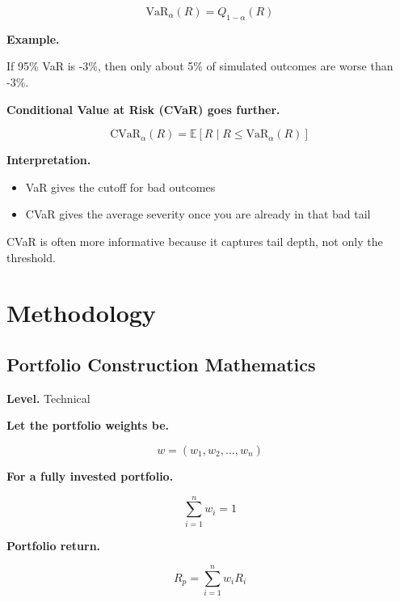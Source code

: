 \documentclass[11pt]{report}
\begin{document}
\begin{equation}
\mathrm{VaR}_{\alpha}(R) = Q_{1-\alpha}(R)
\end{equation}

\begin{callout}
\textbf{Example.}

If 95\% VaR is -3\%, then only about 5\% of simulated outcomes are worse than -3\%.
\end{callout}

\textbf{Conditional Value at Risk (CVaR) goes further.}

\begin{equation}
\mathrm{CVaR}_{\alpha}(R) = \mathbb{E}[R \mid R \le \mathrm{VaR}_{\alpha}(R)]
\end{equation}

\textbf{Interpretation.}

\begin{itemize}
\item VaR gives the cutoff for bad outcomes
\item CVaR gives the average severity once you are already in that bad tail
\end{itemize}

CVaR is often more informative because it captures tail depth, not only the threshold.

\chapter{Methodology}

\section{Portfolio Construction Mathematics}
\begin{callout}
\textbf{Level.} Technical
\end{callout}

\textbf{Let the portfolio weights be.}

\begin{equation}
w = (w_1, w_2, \dots, w_n)
\end{equation}

\textbf{For a fully invested portfolio.}

\begin{equation}
\sum_{i=1}^{n} w_i = 1
\end{equation}

\textbf{Portfolio return.}

\begin{equation}
R_p = \sum_{i=1}^{n} w_i R_i
\end{equation}
\end{document}
